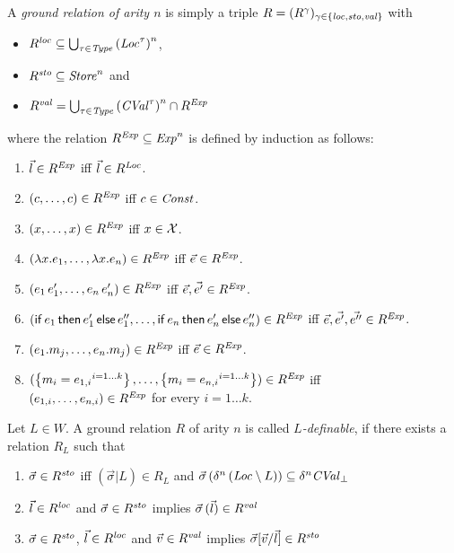 \documentclass[12pt,a4paper]{report}
\begin{document}
\begin{definition}
  A {\em ground relation of arity $n$} is simply a triple $R = (R^\gamma)_{\gamma\in\{\mathit{loc},\mathit{sto},\mathit{val}\}}$ with
  \begin{itemize}
    \item $R^{\mathit{loc}} \subseteq \bigcup_{\tau\in\mathit{Type}} \left(\mathit{Loc}^\tau\right)^n$,
    \item $R^{\mathit{sto}} \subseteq \mathit{Store}^n$ and
    \item $R^{\mathit{val}} = \bigcup_{\tau\in\mathit{Type}} \left(\mathit{CVal}^\tau\right)^n \cap R^{\mathit{Exp}}$
  \end{itemize}
  where the relation $R^{\mathit{Exp}} \subseteq \mathit{Exp}^n$ is defined by induction as follows:
  \begin{enumerate}
    \item $\vec{l}\in R^{\mathit{Exp}}$ iff $\vec{l}\in R^{\mathit{Loc}}$.
    \item $(c,\ldots,c)\in R^{\mathit{Exp}}$ iff $c\in\mathit{Const}$.
    \item $(x,\ldots,x)\in R^{\mathit{Exp}}$ iff $x\in\mathcal{X}$.
    \item $(\lambda x.e_1,\ldots,\lambda x.e_n)\in R^{\mathit{Exp}}$ iff $\vec{e}\in R^{\mathit{Exp}}$.
    \item $(e_1\,e_1',\ldots,e_n\,e_n')\in R^{\mathit{Exp}}$ iff $\vec{e},\vec{e'}\in R^{\mathit{Exp}}$.
    \item $(\mathsf{if}\,e_1\,\mathsf{then}\,e_1'\,\mathsf{else}\,e_1'',\ldots,\mathsf{if}\,e_n\,\mathsf{then}\,e_n'\,\mathsf{else}\,e_n'')\in R^{\mathit{Exp}}$ iff
          $\vec{e},\vec{e'},\vec{e''}\in R^{\mathit{Exp}}$.
    \item $(e_1.m_j,\ldots,e_n.m_j)\in R^{\mathit{Exp}}$ iff $\vec{e}\in R^{\mathit{Exp}}$.
    \item $(\left\{{m_i=e_{1,i}}^{i=1 \ldots k}\right\},\ldots,\left\{{m_i=e_{n,i}}^{i=1 \ldots k}\right\})\in R^{\mathit{Exp}}$ iff \\
            $(e_{1,i},\ldots,e_{n,i})\in R^{\mathit{Exp}}$ for every $i=1 \ldots k$.
  \end{enumerate}
\end{definition}

\begin{definition}[$L$-definability]
  Let $L \in W$. A ground relation $R$ of arity $n$ is called {\em $L$-definable}, if there
  exists a relation $R_L$ such that
  \begin{enumerate}
    \item $\vec{\sigma}\in R^{\mathit{sto}}$ iff $(\vec{\sigma}|L) \in R_L$ and
          $\vec{\sigma}\,(\delta^n\,(\mathit{Loc} \setminus L)) \subseteq \delta^n \mathit{CVal}_\bot$
    \item $\vec{l}\in R^{\mathit{loc}}$ and $\vec{\sigma}\in R^{\mathit{sto}}$ implies $\vec{\sigma}\,(\vec{l})\in R^{\mathit{val}}$
    \item $\vec{\sigma}\in R^{\mathit{sto}}$, $\vec{l}\in R^{\mathit{loc}}$ and $\vec{v}\in R^{\mathit{val}}$ implies
          $\vec{\sigma}[\vec{v}/\vec{l}]\in R^{\mathit{sto}}$
  \end{enumerate}
\end{definition}
\end{document}
